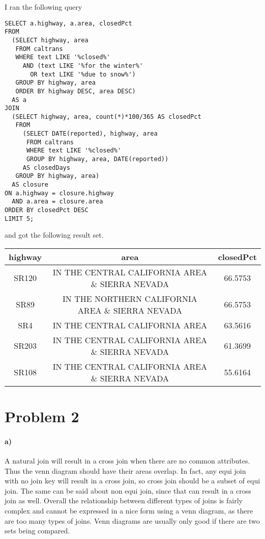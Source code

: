 \documentclass[12pt]{article}
\begin{document}
I ran the following query
\begin{verbatim}
SELECT a.highway, a.area, closedPct
FROM
  (SELECT highway, area
   FROM caltrans
   WHERE text LIKE '%closed%'
     AND (text LIKE '%for the winter%'
       OR text LIKE '%due to snow%')
   GROUP BY highway, area
   ORDER BY highway DESC, area DESC)
  AS a
JOIN
  (SELECT highway, area, count(*)*100/365 AS closedPct
   FROM
     (SELECT DATE(reported), highway, area
      FROM caltrans
      WHERE text LIKE '%closed%'
      GROUP BY highway, area, DATE(reported))
     AS closedDays
   GROUP BY highway, area)
  AS closure
ON a.highway = closure.highway
  AND a.area = closure.area
ORDER BY closedPct DESC
LIMIT 5;
\end{verbatim}
and got the following result set.
\begin{center}
        \hspace*{-4cm}
        \begin{tabular}{c|c|c}
                highway & area & closedPct\\
                \hline
                SR120 & IN THE CENTRAL CALIFORNIA AREA \& SIERRA NEVADA & 66.5753\\
                SR89 & IN THE NORTHERN CALIFORNIA AREA \& SIERRA NEVADA & 66.5753\\
                SR4 & IN THE CENTRAL CALIFORNIA AREA & 63.5616\\
                SR203 & IN THE CENTRAL CALIFORNIA AREA \& SIERRA NEVADA & 61.3699\\
                SR108 & IN THE CENTRAL CALIFORNIA AREA \& SIERRA NEVADA & 55.6164
        \end{tabular}
        \hspace*{-4cm}
\end{center}

\section*{Problem 2}

\paragraph{a)}

A natural join will result in a cross join when there are no common attributes. Thus the venn diagram
should have their areas overlap. In fact, any equi join with no join key will result in a cross join,
so cross join should be a subset of equi join. The same can be said about non equi join, since that can
result in a cross join as well. Overall the relationship between different types of joins is fairly
complex and cannot be expressed in a nice form using a venn diagram, as there are too many types of joins.
Venn diagrams are usually only good if there are two sets being compared.
\end{document}
